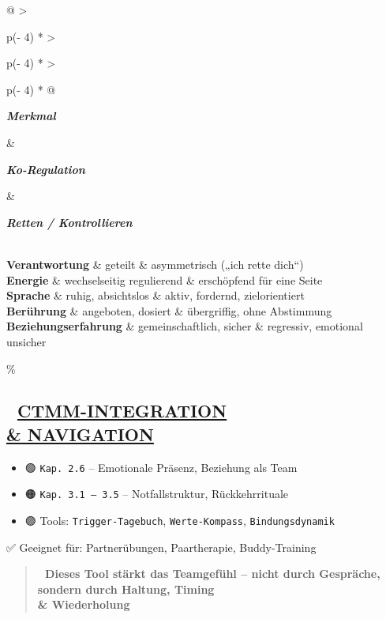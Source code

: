 \begin{longtable}[]{@{}
  >{\raggedright\arraybackslash}p{(\columnwidth - 4\tabcolsep) * }
  >{\raggedright\arraybackslash}p{(\columnwidth - 4\tabcolsep) * }
  >{\raggedright\arraybackslash}p{(\columnwidth - 4\tabcolsep) * }@{}}
\toprule\noalign{}
\begin{minipage}[b]{\linewidth}\raggedright
\emph{\textbf{Merkmal}}
\end{minipage} \& \begin{minipage}[b]{\linewidth}\raggedright
\emph{\textbf{Ko-Regulation}}
\end{minipage} \& \begin{minipage}[b]{\linewidth}\raggedright
\emph{\textbf{Retten / Kontrollieren}}
\end{minipage} \\
\midrule\noalign{}
\endhead
\bottomrule\noalign{}
\endlastfoot
\textbf{Verantwortung} \& geteilt \& asymmetrisch („ich rette dich``) \\
\textbf{Energie} \& wechselseitig regulierend \& erschöpfend für eine Seite \\
\textbf{Sprache} \& ruhig, absichtslos \& aktiv, fordernd, zielorientiert \\
\textbf{Berührung} \& angeboten, dosiert \& übergriffig, ohne Abstimmung \\
\textbf{Beziehungserfahrung} \& gemeinschaftlich, sicher \& regressiv, emotional unsicher \\
\end{longtable}

\hypertarget{ctmm-integration-navigation}{\%
\subsection{\texorpdfstring{🧭 \textbf{\ul{CTMM-INTEGRATION \\& NAVIGATION}}}{🧭 CTMM-INTEGRATION \\& NAVIGATION}}\label{ctmm-integration-navigation}}

\begin{itemize}
\tightlist
\item
  🟢 \texttt{Kap.\ }\texttt{2.6} -- Emotionale Präsenz, Beziehung als Team
\item
  🟠 \texttt{Kap.\ }\texttt{3.1\ –\ 3.5} -- Notfallstruktur, Rückkehrrituale
\item
  🟣 Tools: \texttt{Trigger-}\texttt{Tagebuch}, \texttt{Werte-Kompass}, \texttt{Bindungsdynamik}
\end{itemize}

✅ Geeignet für: Partnerübungen, Paartherapie, Buddy-Training

\begin{quote}
\textbf{📎 Dieses Tool stärkt das Teamgefühl -- nicht durch Gespräche, sondern durch Haltung, Timing \\& Wiederholung}
\end{quote}

